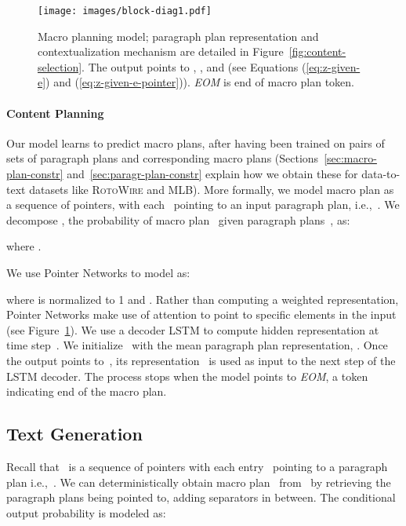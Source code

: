 \documentclass[11pt,a4paper]{article}
\newcommand{\xml}[1]{{\fontfamily{cmtt}\selectfont {#1}}}
\begin{document}
\begin{figure}[t]
  \centering
  \texttt{[image: images/block-diag1.pdf]} \caption{Macro planning model; paragraph plan representation and
    contextualization mechanism are detailed in
    Figure~\ref{fig:content-selection}. The output points to ,
    , and  (see Equations (\ref{eq:z-given-e}) and
    (\ref{eq:z-given-e-pointer})). \emph{EOM} is end of macro plan token.}
  \label{fig:macro-planning}
\end{figure}


\paragraph{Content Planning}
Our model learns to predict macro plans, after having been trained on
pairs of sets of paragraph plans and corresponding macro plans
(Sections~\ref{sec:macro-plan-constr} and~\ref{sec:paragr-plan-constr}
explain how we obtain these for data-to-text datasets like
\textsc{RotoWire} and MLB). More formally, we model macro plan  as a sequence of pointers, with each~ pointing
to an input paragraph plan, i.e.,~\mbox{}. We decompose , the probability of macro
plan~ given paragraph plans~, as:

where .

We use Pointer Networks \cite{NIPS2015_5866} to model  as:

where  is normalized to 1 and .  Rather than computing a weighted
representation, Pointer Networks make use of attention to point to
specific elements in the input (see Figure~\ref{fig:macro-planning}).
We use a decoder LSTM to compute hidden representation 
at time step~. We initialize~ with the mean paragraph
plan representation, .
Once the output points to~, its representation~
is used as input to the next step of the LSTM decoder.  The process
stops when the model points to {\it EOM}, a token indicating end of
the macro plan.



\subsection{Text Generation}
\label{sec:text-generation}

Recall that~ is a sequence of pointers with each entry~
pointing to a paragraph plan i.e.,~.  We
can deterministically obtain macro plan~ from~ by retrieving the
paragraph plans being pointed to, adding \textcolor{blue}{\xml{P}}
 separators in between. The conditional output probability  is modeled as:
\end{document}
